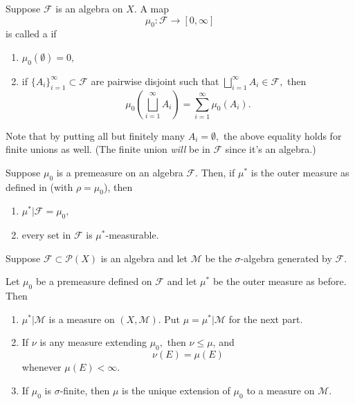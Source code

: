 \documentclass[12pt]{article}	%
\begin{document}
\begin{defn}[Premeasure]
	Suppose $\mathcal{F}$ is an algebra on $X.$ A map
	\begin{equation*} 
		\mu_0 : \mathcal{F} \to [0, \infty]
	\end{equation*}
	is called a  if
	\begin{enumerate}
		\item $\mu_0(\emptyset) = 0,$
		\item if $\{A_i\}_{i = 1}^\infty \subset \mathcal{F}$ are pairwise disjoint such that $\bigsqcup_{i = 1}^\infty A_i \in \mathcal{F},$ then
		\begin{equation*} 
			\mu_0\left(\bigsqcup_{i = 1}^\infty A_i\right) = \sum_{i = 1}^{\infty} \mu_0(A_i).
		\end{equation*}
	\end{enumerate}
\end{defn}
Note that by putting all but finitely many $A_i = \emptyset,$ the above equality holds for finite unions as well. (The finite union \emph{will} be in $\mathcal{F}$ since it's an algebra.)

\begin{prop}
	Suppose $\mu_0$ is a premeasure on an algebra $\mathcal{F}.$ Then, if $\mu^*$ is the outer measure as defined in  (with $\rho = \mu_0$), then
	\begin{enumerate}
		\item $\mu^*|\mathcal{F} = \mu_0,$
		\item every set in $\mathcal{F}$ is $\mu^*$-measurable.
	\end{enumerate}
\end{prop}

\begin{thm}
	Suppose $\mathcal{F} \subset \mathcal{P}(X)$ is an algebra and let $\mathcal{M}$ be the $\sigma$-algebra generated by $\mathcal{F}.$

	Let $\mu_0$ be a premeasure defined on $\mathcal{F}$ and let $\mu^*$ be the outer measure as before. Then
	\begin{enumerate}
		\item $\mu^*|\mathcal{M}$ is a measure on $(X, \mathcal{M}).$ Put $\mu = \mu^*|\mathcal{M}$ for the next part.
		\item If $\nu$ is any measure extending $\mu_0,$ then $\nu \le \mu$, and
		\begin{equation*} 
			\nu(E) = \mu(E)
		\end{equation*}
		whenever $\mu(E) < \infty.$ 
		\item If $\mu_{0}$ is $\sigma$-finite, then $\mu$ is the unique extension of $\mu_{0}$ to a measure on $\mathcal{M}$.
	\end{enumerate}
\end{thm}
\end{document}
